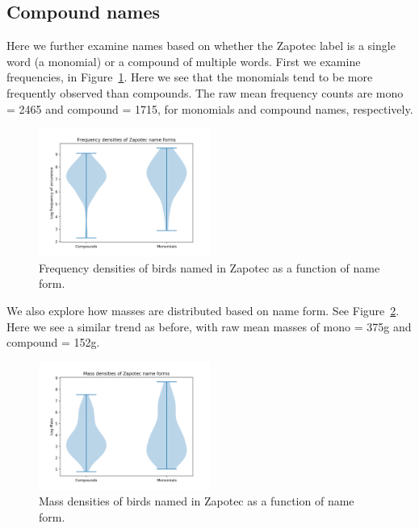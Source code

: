 \documentclass[10pt,letterpaper]{article}
\begin{document}
\subsection{Compound names}
Here we further examine names based on whether the Zapotec label is a single word (a monomial) or a compound of multiple words. First we examine frequencies, in Figure~\ref{fig-freq-nameforms}. Here we see that the monomials tend to be more frequently observed than compounds. The raw mean frequency counts are mono = 2465 and compound = 1715, for monomials and compound names, respectively.

\begin{figure}[h!]
  \begin{center}
    \includegraphics[width=0.5\textwidth]{./figures/freq-nameforms.png}
        \caption{Frequency densities of birds named in Zapotec as a function of name form.}
        \label{fig-freq-nameforms}
  \end{center}
\end{figure}

We also explore how masses are distributed based on name form. See Figure~\ref{fig-mass-nameforms}. Here we see a similar trend as before, with raw mean masses of mono = 375g and compound = 152g.

\begin{figure}[h!]
  \begin{center}
    \includegraphics[width=0.5\textwidth]{./figures/mass-nameforms.png}
        \caption{Mass densities of birds named in Zapotec as a function of name form.}
        \label{fig-mass-nameforms}
  \end{center}
\end{figure}
\end{document}
